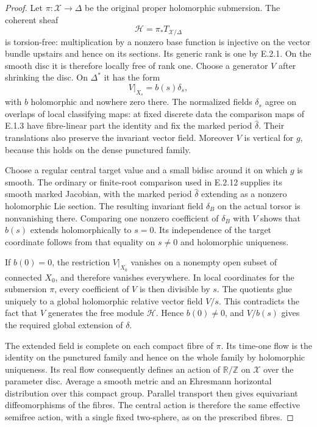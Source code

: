 \begin{proof}
Let $\pi:\mathcal X\to\Delta$ be the original
proper holomorphic submersion.  The coherent sheaf
\[
 \mathcal H=\pi_*T_{\mathcal X/\Delta}
\]
is torsion-free: multiplication by a nonzero base
function is injective on the vector bundle upstairs
and hence on its sections.  Its generic rank is
one by E.2.1.  On the smooth disc it is therefore
locally free of rank one.  Choose a generator $V$
after shrinking the disc.  On $\Delta^*$ it has
the form
\[
 V|_{X_s}=b(s)\delta_s,
\]
with $b$ holomorphic and nowhere zero there.
The normalized fields $\delta_s$ agree on overlaps
of local classifying maps: at fixed discrete data
the comparison maps of E.1.3 have fibre-linear
part the identity and fix the marked period
$\widehat\delta$.  Their translations also
preserve the invariant vector field.
Moreover $V$ is vertical for $g$, because this
holds on the dense punctured family.

Choose a regular central target value and a small
bidisc around it on which $g$ is smooth.  The
ordinary or finite-root comparison used in
E.2.12 supplies its smooth marked Jacobian, with
the marked period $\widehat\delta$ extending as
a nonzero holomorphic Lie section.  The resulting
invariant field $\delta_B$ on the actual torsor
is nonvanishing there.  Comparing one nonzero
coefficient of $\delta_B$ with $V$ shows that
$b(s)$ extends holomorphically to $s=0$.
Its independence of the target coordinate follows
from that equality on $s\ne0$ and holomorphic
uniqueness.

If $b(0)=0$, the restriction $V|_{X_0}$ vanishes
on a nonempty open subset of connected $X_0$,
and therefore vanishes everywhere.  In local
coordinates for the submersion $\pi$, every
coefficient of $V$ is then divisible by $s$.
The quotients glue uniquely to a global
holomorphic relative vector field $V/s$.
This contradicts the fact that $V$ generates
the free module $\mathcal H$.  Hence $b(0)\ne0$,
and $V/b(s)$ gives the required global extension
of $\delta$.

The extended field is complete on each compact
fibre of $\pi$.  Its time-one flow is the
identity on the punctured family and hence on
the whole family by holomorphic uniqueness.
Its real flow consequently defines an action
of $\mathbb R/\mathbb Z$ on $\mathcal X$
over the parameter disc.  Average a smooth
metric and an Ehresmann horizontal distribution
over this compact group.  Parallel transport
then gives equivariant diffeomorphisms of
the fibres.  The central action is therefore
the same effective semifree action, with a
single fixed two-sphere, as on the prescribed
fibres.


\end{proof}
